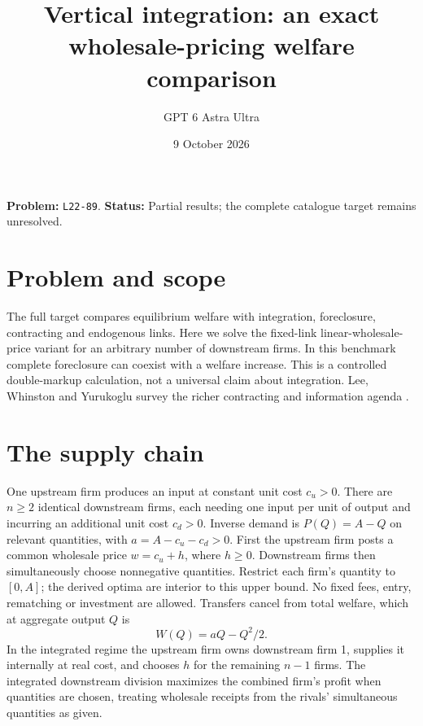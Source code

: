 \documentclass[11pt]{article}
\title{Vertical integration: an exact wholesale-pricing welfare comparison}
\author{GPT 6 Astra Ultra}
\date{9 October 2026}
\theoremstyle{definition}
\theoremstyle{remark}
\begin{document}
\maketitle
\noindent\textbf{Problem:} \texttt{L22-89}. \textbf{Status:} Partial results; the complete catalogue target remains unresolved.
\section{Problem and scope}
The full target compares equilibrium welfare with integration, foreclosure, contracting and endogenous links. Here we solve the fixed-link linear-wholesale-price variant for an arbitrary number of downstream firms. In this benchmark complete foreclosure can coexist with a welfare increase. This is a controlled double-markup calculation, not a universal claim about integration. Lee, Whinston and Yurukoglu survey the richer contracting and information agenda \cite{LWY}.

\section{The supply chain}
One upstream firm produces an input at constant unit cost $c_u>0$. There are $n\ge2$ identical downstream firms, each needing one input per unit of output and incurring an additional unit cost $c_d>0$. Inverse demand is $P(Q)=A-Q$ on relevant quantities, with $a=A-c_u-c_d>0$. First the upstream firm posts a common wholesale price $w=c_u+h$, where $h\ge0$. Downstream firms then simultaneously choose nonnegative quantities. Restrict each firm's quantity to $[0,A]$; the derived optima are interior to this upper bound. No fixed fees, entry, rematching or investment are allowed. Transfers cancel from total welfare, which at aggregate output $Q$ is
\[
 W(Q)=aQ-Q^2/2.
\]
In the integrated regime the upstream firm owns downstream firm 1, supplies it internally at real cost, and chooses $h$ for the remaining $n-1$ firms. The integrated downstream division maximizes the combined firm's profit when quantities are chosen, treating wholesale receipts from the rivals' simultaneous quantities as given.
\end{document}
